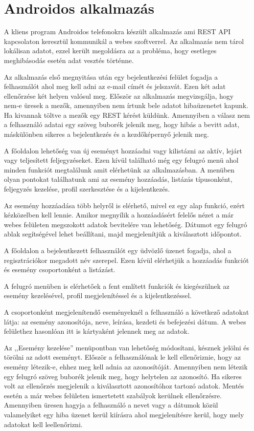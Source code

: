 \documentclass[
]{thesis-ekf}
\theoremstyle{definition}
\theoremstyle{remark}
\begin{document}
\section{Androidos alkalmazás}
A kliens program Androidos telefonokra készült alkalmazás ami REST API kapcsolaton keresztül kommunikál a webes szoftverrel. Az alkalmazás nem tárol lokálisan adatot, ezzel került megoldásra az a probléma, hogy esetleges meghibásodás esetén adat vesztés történne. 

Az alkalmazás első megnyitása után egy bejelentkezési felület fogadja a felhasználót ahol meg kell adni az e-mail címét és jelszavát. Ezen két adat ellenőrzése két helyen valósul meg. Először az alkalmazás megvizsgálja, hogy nem-e üresek a mezők, amennyiben nem írtunk bele adatot hibaüzenetet kapunk. Ha kivannak töltve a mezők egy REST kérést küldünk. Amennyiben a válasz nem a felhasználó adatai egy szöveg buborék jelenik meg, hogy hibás a bevitt adat, máskülönben sikeres a bejelentkezés és a kezdőképernyő jelenik meg.

A főoldalon lehetőség van új eseményt hozzáadni vagy kilistázni az aktív, lejárt vagy teljesített feljegyzéseket. Ezen kívül található még egy felugró menü ahol minden funkciót megtalálunk amit elérhetünk az alkalmazásban. A menüben olyan pontokat találhatunk ami az esemény hozzáadás, listázás típusonként, feljegyzés kezelése, profil szerkesztése és a kijelentkezés. 

Az esemény hozzáadása több helyről is elérhető, mivel ez egy alap funkció, ezért kézközelben kell lennie. Amikor megnyílik a hozzáadásért felelős nézet a már webes felületen megszokott adatok bevitelére van lehetőség. Dátumot egy felugró ablak segítségével lehet beállítani, majd megjelenítjük a kiválasztott időpontot. 

A főoldalon a bejelentkezett felhasználót egy üdvözlő üzenet fogadja, ahol a regisztrációkor megadott név szerepel. Ezen kívül elérhetjük a hozzáadás funkciót és esemény csoportonként a listázást. 

A felugró menüben is elérhetőek a fent említett funkciók és kiegészülnek az esemény kezelésével, profil megjelenítéssel és a kijelentkezéssel. 

A csoportonként megjelenítendő eseményeknél a felhasználó a következő adatokat látja: az esemény azonosítója, neve, leírása, kezdeti és befejezési dátum. A webes felülethez hasonlóan itt is kártyaként jelennek meg az adatok. 

Az ,,Esemény kezelése'' menüpontban van lehetőség módosítani, késznek jelölni és törölni az adott eseményt. Először a felhasználónak le kell ellenőriznie, hogy az esemény létezik-e, ehhez meg kell adnia az azonosítóját. Amennyiben nem létezik egy felugró szöveg buborék jelenik meg, hogy helytelen az azonosító. Ha sikeres volt az ellenőrzés megjelenik a kiválasztott azonosítóhoz tartozó adatok. Mentés esetén a már webes felületen ismertetett szabályok kerülnek ellenőrzésre. Amennyiben üresen hagyja a felhasználó a nevet vagy a dátumok közül valamelyiket egy hiba üzenet kerül kiírásra ahol megjelenítésre kerül, hogy mely adatokat kell leellenőrizni. 
\end{document}
